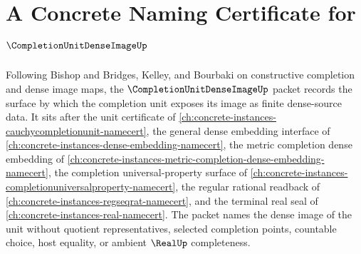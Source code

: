 \chapter{A Concrete Naming Certificate for $\CompletionUnitDenseImageUp$}
\label{ch:concrete-instances-completion-unit-dense-image-namecert}

Following Bishop and Bridges, Kelley, and Bourbaki on constructive completion and dense image maps, the $\CompletionUnitDenseImageUp$ packet records the surface by which the completion unit exposes its image as finite dense-source data. It sits after the unit certificate of \autoref{ch:concrete-instances-cauchycompletionunit-namecert}, the general dense embedding interface of \autoref{ch:concrete-instances-dense-embedding-namecert}, the metric completion dense embedding of \autoref{ch:concrete-instances-metric-completion-dense-embedding-namecert}, the completion universal-property surface of \autoref{ch:concrete-instances-completionuniversalproperty-namecert}, the regular rational readback of \autoref{ch:concrete-instances-regseqrat-namecert}, and the terminal real seal of \autoref{ch:concrete-instances-real-namecert}. The packet names the dense image of the unit without quotient representatives, selected completion points, countable choice, host equality, or ambient $\RealUp$ completeness.

